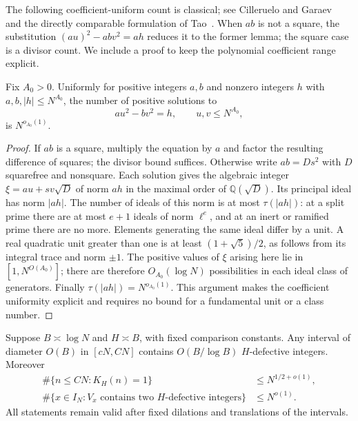 The following coefficient-uniform count is classical; see
Cilleruelo and Garaev~\cite[Section~3, Lemma~4 and Proposition~1]{cilleruelogaraev2011}
and the directly comparable formulation of
Tao~\cite[Lemma~2.10]{tao2026anatomy}.  When $ab$ is not a square,
the substitution $(au)^2-abv^2=ah$ reduces it to the former lemma;
the square case is a divisor count.  We include a proof to keep the
polynomial coefficient range explicit.

\begin{lemma}\label{p1:arith:pell}
Fix $A_0>0$.  Uniformly for positive integers $a,b$ and nonzero integers $h$
with $a,b,|h|\leq N^{A_0}$, the number of positive solutions to
\[
 au^2-bv^2=h,\qquad u,v\leq N^{A_0},
\]
is $N^{o_{A_0}(1)}$.
\end{lemma}

\begin{proof}
If $ab$ is a square, multiply the equation by $a$ and factor the resulting
difference of squares; the divisor bound suffices.  Otherwise write
$ab=Ds^2$ with $D$ squarefree and nonsquare.  Each solution gives the
algebraic integer
$\xi=au+sv\sqrt D$ of norm $ah$ in the maximal order of
$\mathbb Q(\sqrt D)$.  Its principal ideal has norm $|ah|$.
The number of ideals of this norm is at most $\tau(|ah|)$: at a split prime
there are at most $e+1$ ideals of norm $\ell^e$, and at an inert or ramified
prime there are no more.  Elements generating the same ideal differ by a
unit.  A real quadratic unit greater than one is at least
$(1+\sqrt5)/2$, as follows from its integral trace and norm $\pm1$.
The positive values of $\xi$ arising here lie in $[1,N^{O(A_0)}]$;
there are therefore $O_{A_0}(\log N)$ possibilities in each ideal class
of generators.  Finally $\tau(|ah|)=N^{o_{A_0}(1)}$.  This argument makes
the coefficient uniformity explicit and requires no bound for a fundamental
unit or a class number.
\end{proof}

\begin{lemma}\label{p1:arith:defects}
Suppose $B\asymp\log N$ and $H\asymp B$, with fixed comparison constants.
Any interval of diameter $O(B)$ in $[cN,CN]$ contains
$O(B/\log B)$ $H$-defective integers.  Moreover
\begin{align}
 \#\{n\leq CN:K_H(n)=1\}&\leq N^{1/2+o(1)},\label{p1:arith:onedfect}\\
 \#\{x\in I_N:V_x\text{ contains two }H\text{-defective integers}\}
   &\leq N^{o(1)}.\label{p1:arith:twodefect}
\end{align}
All statements remain valid after fixed dilations and translations of the
intervals.
\end{lemma}

